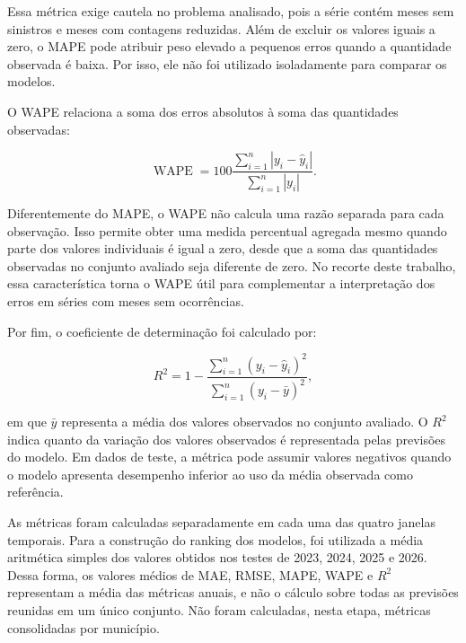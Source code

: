 \documentclass[12pt]{article}
\begin{document}
Essa métrica exige cautela no problema analisado, pois a série contém meses sem sinistros e meses com contagens reduzidas. Além de excluir os valores iguais a zero, o MAPE pode atribuir peso elevado a pequenos erros quando a quantidade observada é baixa. Por isso, ele não foi utilizado isoladamente para comparar os modelos.

O WAPE relaciona a soma dos erros absolutos à soma das quantidades observadas:

\begin{equation}
    \operatorname{WAPE} =
    100
    \frac{
        \sum_{i=1}^{n}
        \left|y_i-\hat{y}_i\right|
    }{
        \sum_{i=1}^{n}
        \left|y_i\right|
    }.
    \label{eq:wape}
\end{equation}

Diferentemente do MAPE, o WAPE não calcula uma razão separada para cada observação. Isso permite obter uma medida percentual agregada mesmo quando parte dos valores individuais é igual a zero, desde que a soma das quantidades observadas no conjunto avaliado seja diferente de zero. No recorte deste trabalho, essa característica torna o WAPE útil para complementar a interpretação dos erros em séries com meses sem ocorrências.

Por fim, o coeficiente de determinação foi calculado por:

\begin{equation}
    R^2 =
    1 -
    \frac{
        \sum_{i=1}^{n}
        \left(y_i-\hat{y}_i\right)^2
    }{
        \sum_{i=1}^{n}
        \left(y_i-\bar{y}\right)^2
    },
    \label{eq:r2}
\end{equation}

em que $\bar{y}$ representa a média dos valores observados no conjunto avaliado. O $R^2$ indica quanto da variação dos valores observados é representada pelas previsões do modelo. Em dados de teste, a métrica pode assumir valores negativos quando o modelo apresenta desempenho inferior ao uso da média observada como referência.

As métricas foram calculadas separadamente em cada uma das quatro janelas temporais. Para a construção do ranking dos modelos, foi utilizada a média aritmética simples dos valores obtidos nos testes de 2023, 2024, 2025 e 2026. Dessa forma, os valores médios de MAE, RMSE, MAPE, WAPE e $R^2$ representam a média das métricas anuais, e não o cálculo sobre todas as previsões reunidas em um único conjunto. Não foram calculadas, nesta etapa, métricas consolidadas por município.

\nocite{*}


\end{document}
